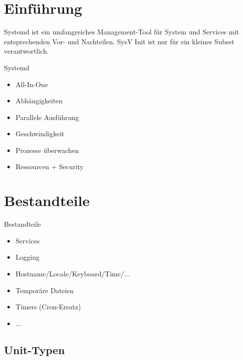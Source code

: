 
\maketitle

\begin{frame}
  \titlepage
\end{frame}

\cleardoublepage

\tableofcontents

\cleardoublepage

\section{Einführung}

Systemd ist ein umfangreiches Management-Tool für System und Services mit
entsprechenden Vor- und Nachteilen. SysV Init ist nur für ein kleines Subset verantwortlich.

\begin{frame}{Systemd}
  \begin{itemize}
    \item All-In-One
    \item Abhängigkeiten
    \item Parallele Ausführung
    \item Geschwindigkeit
    \item Prozesse überwachen
    \item Ressourcen + Security
  \end{itemize}
\end{frame}

\section{Bestandteile}

\begin{frame}{Bestandteile}
  \begin{itemize}
\item Services
\item Logging
\item Hostname/Locale/Keyboard/Time/...
\item Temporäre Dateien
\item Timers (Cron-Ersatz)
\item ...
\end{itemize}
\end{frame}

\subsection{Unit-Typen}

